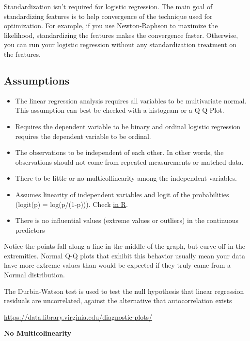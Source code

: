 \documentclass[]{book}
\theoremstyle{definition}
\theoremstyle{definition}
\theoremstyle{definition}
\theoremstyle{remark}
\begin{document}
Standardization isn't required for logistic regression. The main goal of
standardizing features is to help convergence of the technique used for
optimization. For example, if you use Newton-Raphson to maximize the
likelihood, standardizing the features makes the convergence faster.
Otherwise, you can run your logistic regression without any
standardization treatment on the features.

\subsection{Assumptions}\label{assumptions-2}

\begin{itemize}
\item
  The linear regression analysis requires all variables to be
  multivariate normal. This assumption can best be checked with a
  histogram or a Q-Q-Plot.
\item
  Requires the dependent variable to be binary and ordinal logistic
  regression requires the dependent variable to be ordinal.
\item
  The observations to be independent of each other. In other words, the
  observations should not come from repeated measurements or matched
  data.
\item
  There to be little or no multicollinearity among the independent
  variables.
\item
  Assumes linearity of independent variables and logit of the
  probabilities (logit(p) = log(p/(1-p))). Check
  \href{https://stats.stackexchange.com/questions/169348/how-should-i-check-the-assumption-of-linearity-to-the-logit-for-the-continuous-i}{in
  R}.
\item
  There is no influential values (extreme values or outliers) in the
  continuous predictors
\end{itemize}

Notice the points fall along a line in the middle of the graph, but
curve off in the extremities. Normal Q-Q plots that exhibit this
behavior usually mean your data have more extreme values than would be
expected if they truly came from a Normal distribution.

The Durbin-Watson test is used to test the null hypothesis that linear
regression residuals are uncorrelated, against the alternative that
autocorrelation exists

\url{https://data.library.virginia.edu/diagnostic-plots/}

\textbf{No Multicolinearity}
\end{document}
